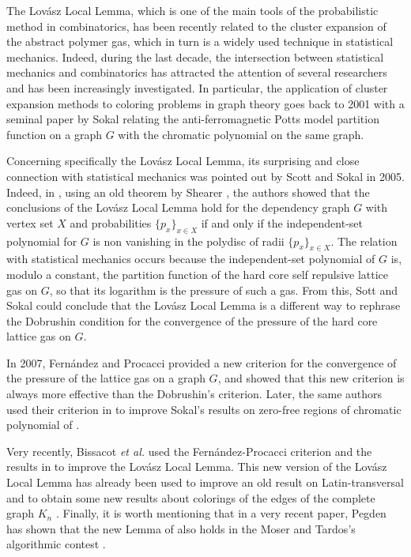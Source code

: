 \documentclass[11pt]{article}
\begin{document}
The Lov\'asz Local Lemma, which  is one of the main  tools of the probabilistic method in combinatorics, has been recently related  to the cluster expansion
of the abstract polymer gas, which in turn is a widely used technique in statistical mechanics.
Indeed, during the   last decade, the intersection between statistical mechanics and combinatorics has attracted the attention of several researchers
and has been increasingly investigated. In particular,
the application of cluster expansion methods to  coloring problems in graph theory goes back to 2001 with a  seminal paper by Sokal
\cite{S} relating the anti-ferromagnetic Potts model partition function on  a graph $G$ with the chromatic polynomial  on the same graph.



Concerning specifically the Lov\'asz Local Lemma, its  surprising and close
connection with statistical mechanics was pointed out by
Scott and Sokal \cite{SS} in 2005. Indeed, in \cite{SS}, using
an old theorem by Shearer \cite{Sh}, the authors showed that the conclusions of the Lov\'asz Local Lemma hold for the
dependency graph $G$ with vertex set $X$ and probabilities $\{p_x\}_{x\in X}$ if and only if the independent-set
polynomial for $G$ is non vanishing in the polydisc of radii $\{p_x\}_{x\in X}$. The relation with statistical mechanics
occurs because the independent-set
polynomial of $G$ { is}, modulo a constant, the partition function of the hard core self repulsive lattice gas on $G$, so that
its logarithm is the pressure of such a gas.
From this, Sott and Sokal could conclude that the Lov\'asz Local Lemma is  a different way to rephrase
the Dobrushin condition \cite{Dob} for  the convergence of  the pressure of the hard core lattice gas on $G$.

In 2007,  Fern\'andez and Procacci  \cite{FP} provided a new   criterion for  the convergence of  the pressure of the lattice gas on a graph  $G$,
and showed  that this  new criterion is always more effective
than the Dobrushin's criterion. Later, the same authors used their criterion in \cite{FP2} to improve Sokal's results on zero-free regions of chromatic polynomial of \cite{S}.

Very recently,  Bissacot {\it et al.} \cite{BFPS} used the Fern\'andez-Procacci criterion \cite{FP} and the results in \cite{SS}  to
improve the Lov\'asz Local Lemma. This new version of the  Lov\'asz Local Lemma has already been  used to improve
an old result on Latin-transversal \cite{BFPS} and
to obtain some new results  about colorings   of the edges of the complete graph $K_n$ \cite{BKP}.
Finally, it is worth mentioning  that in a very recent paper,   Pegden  \cite{Pe} has shown that the new  Lemma  of \cite{BFPS} also holds in the  Moser and Tardos's  algorithmic contest \cite{MT}.
\end{document}
